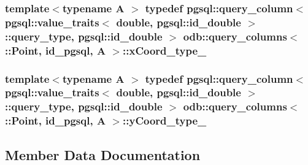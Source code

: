 \subsubsection[{x\+Coord\+\_\+type\+\_\+}]{\setlength{\rightskip}{0pt plus 5cm}template$<$typename A $>$ typedef pgsql\+::query\+\_\+column$<$ pgsql\+::value\+\_\+traits$<$ double, pgsql\+::id\+\_\+double $>$\+::query\+\_\+type, pgsql\+::id\+\_\+double $>$ odb\+::query\+\_\+columns$<$ \+::{\bf Point}, id\+\_\+pgsql, A $>$\+::{\bf x\+Coord\+\_\+type\+\_\+}}\label{structodb_1_1query__columns_3_01_1_1_point_00_01id__pgsql_00_01_a_01_4_a2410ebc7698f7395087c9cf262e74e67}
\hypertarget{structodb_1_1query__columns_3_01_1_1_point_00_01id__pgsql_00_01_a_01_4_a63554286768ef21f26b9034334df7a25}{}
\subsubsection[{y\+Coord\+\_\+type\+\_\+}]{\setlength{\rightskip}{0pt plus 5cm}template$<$typename A $>$ typedef pgsql\+::query\+\_\+column$<$ pgsql\+::value\+\_\+traits$<$ double, pgsql\+::id\+\_\+double $>$\+::query\+\_\+type, pgsql\+::id\+\_\+double $>$ odb\+::query\+\_\+columns$<$ \+::{\bf Point}, id\+\_\+pgsql, A $>$\+::{\bf y\+Coord\+\_\+type\+\_\+}}\label{structodb_1_1query__columns_3_01_1_1_point_00_01id__pgsql_00_01_a_01_4_a63554286768ef21f26b9034334df7a25}


\subsection{Member Data Documentation}
\hypertarget{structodb_1_1query__columns_3_01_1_1_point_00_01id__pgsql_00_01_a_01_4_ac40ef5740dd441d21985f09d99b04d85}{}
